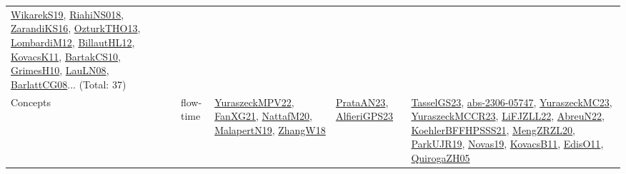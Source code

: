 {\begin{longtable}{lp{3cm}>{\raggedright}p{6cm}>{\raggedright}p{6cm}p{8cm}}
\href{articles/WikarekS19.pdf}{WikarekS19}\cite{WikarekS19}, \href{papers/RiahiNS018.pdf}{RiahiNS018}\cite{RiahiNS018}, \href{articles/ZarandiKS16.pdf}{ZarandiKS16}\cite{ZarandiKS16}, \href{articles/OzturkTHO13.pdf}{OzturkTHO13}\cite{OzturkTHO13}, \href{articles/LombardiM12.pdf}{LombardiM12}\cite{LombardiM12}, \href{papers/BillautHL12.pdf}{BillautHL12}\cite{BillautHL12}, \href{articles/KovacsK11.pdf}{KovacsK11}\cite{KovacsK11}, \href{articles/BartakCS10.pdf}{BartakCS10}\cite{BartakCS10}, \href{papers/GrimesH10.pdf}{GrimesH10}\cite{GrimesH10}, \href{papers/LauLN08.pdf}{LauLN08}\cite{LauLN08}, \href{papers/BarlattCG08.pdf}{BarlattCG08}\cite{BarlattCG08}... (Total: 37)\\
Concepts & flow-time & \href{articles/YuraszeckMPV22.pdf}{YuraszeckMPV22}\cite{YuraszeckMPV22}, \href{articles/FanXG21.pdf}{FanXG21}\cite{FanXG21}, \href{papers/NattafM20.pdf}{NattafM20}\cite{NattafM20}, \href{papers/MalapertN19.pdf}{MalapertN19}\cite{MalapertN19}, \href{articles/ZhangW18.pdf}{ZhangW18}\cite{ZhangW18} & \href{articles/PrataAN23.pdf}{PrataAN23}\cite{PrataAN23}, \href{articles/AlfieriGPS23.pdf}{AlfieriGPS23}\cite{AlfieriGPS23} & \href{papers/TasselGS23.pdf}{TasselGS23}\cite{TasselGS23}, \href{articles/abs-2306-05747.pdf}{abs-2306-05747}\cite{abs-2306-05747}, \href{papers/YuraszeckMC23.pdf}{YuraszeckMC23}\cite{YuraszeckMC23}, \href{articles/YuraszeckMCCR23.pdf}{YuraszeckMCCR23}\cite{YuraszeckMCCR23}, \href{papers/LiFJZLL22.pdf}{LiFJZLL22}\cite{LiFJZLL22}, \href{articles/AbreuN22.pdf}{AbreuN22}\cite{AbreuN22}, \href{articles/KoehlerBFFHPSSS21.pdf}{KoehlerBFFHPSSS21}\cite{KoehlerBFFHPSSS21}, \href{articles/MengZRZL20.pdf}{MengZRZL20}\cite{MengZRZL20}, \href{papers/ParkUJR19.pdf}{ParkUJR19}\cite{ParkUJR19}, \href{articles/Novas19.pdf}{Novas19}\cite{Novas19}, \href{articles/KovacsB11.pdf}{KovacsB11}\cite{KovacsB11}, \href{papers/EdisO11.pdf}{EdisO11}\cite{EdisO11}, \href{papers/QuirogaZH05.pdf}{QuirogaZH05}\cite{QuirogaZH05}\\

\end{longtable}}
